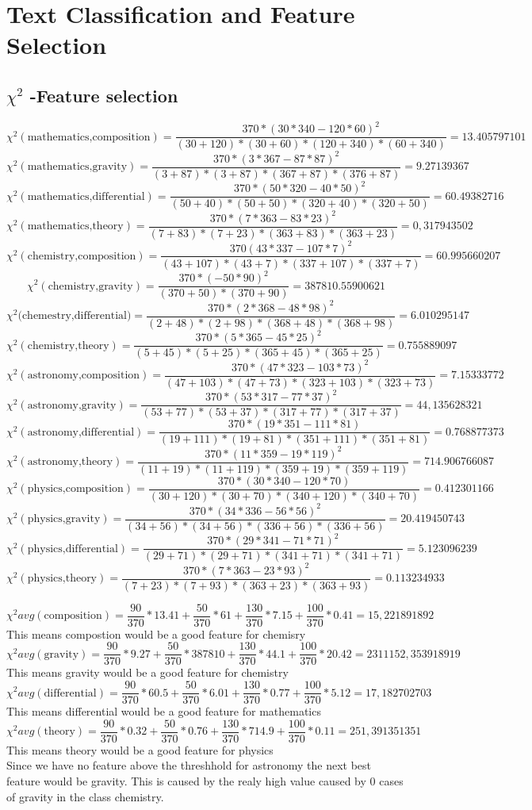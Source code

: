 \documentclass{article}
\begin{document}
\section{Text Classification and Feature Selection}
\setcounter{subsection}{2}
\subsection{$\chi^2$ -Feature selection}
$$\chi^2(\text{mathematics,composition})=\frac{370*(30*340-120*60)^2}{(30+120)*(30+60)*(120+340)*(60+340)}=13.405797101$$
$$\chi^2(\text{mathematics,gravity})=\frac{370*(3*367-87*87)^2}{(3+87)*(3+87)*(367+87)*(376+87)}=9.27139367$$
$$\chi^2(\text{mathematics,differential})=\frac{370*(50*320-40*50)^2}{(50+40)*(50+50)*(320+40)*(320+50)}=60.49382716$$
$$\chi^2(\text{mathematics,theory})=\frac{370*(7*363-83*23)^2}{(7+83)*(7+23)*(363+83)*(363+23)}=0,317943502$$
$$\chi^2(\text{chemistry,composition})=\frac{370(43*337-107*7)^2}{(43+107)*(43+7)*(337+107)*(337+7)}=60.995660207$$
$$\chi^2(\text{chemistry,gravity})=\frac{370*(-50*90)^2}{(370+50)*(370+90)}=387810.55900621$$
$$\chi^2(\text{chemestry,differential)}=\frac{370*(2*368-48*98)^2}{(2+48)*(2+98)*(368+48)*(368+98)}=6.010295147$$
$$\chi^2(\text{chemistry,theory})=\frac{370*(5*365-45*25)^2}{(5+45)*(5+25)*(365+45)*(365+25)}=0.755889097$$
$$\chi^2(\text{astronomy,composition})=\frac{370*(47*323-103*73)^2}{(47+103)*(47+73)*(323+103)*(323+73)}=7.15333772$$
$$\chi^2(\text{astronomy,gravity})=\frac{370*(53*317-77*37)^2}{(53+77)*(53+37)*(317+77)*(317+37)}=44,135628321$$
$$\chi^2(\text{astronomy,differential})=\frac{370*(19*351-111*81)}{(19+111)*(19+81)*(351+111)*(351+81)}=0.768877373$$
$$\chi^2(\text{astronomy,theory})=\frac{370*(11*359-19*119)^2}{(11+19)*(11+119)*(359+19)*(359+119)}=714.906766087$$
$$\chi^2(\text{physics,composition})=\frac{370*(30*340-120*70)}{(30+120)*(30+70)*(340+120)*(340+70)}=0.412301166$$
$$\chi^2(\text{physics,gravity})=\frac{370*(34*336-56*56)^2}{(34+56)*(34+56)*(336+56)*(336+56)}=20.419450743$$
$$\chi^2(\text{physics,differential})=\frac{370*(29*341-71*71)^2}{(29+71)*(29+71)*(341+71)*(341+71)}=5.123096239$$
$$\chi^2(\text{physics,theory})=\frac{370*(7*363-23*93)^2}{(7+23)*(7+93)*(363+23)*(363+93)}=0.113234933$$

$$\chi^2 avg(\text{composition})=\frac{90}{370}*13.41+\frac{50}{370}*61+\frac{130}{370}*7.15+\frac{100}{370}*0.41=15,221891892$$
This means compostion would be a good feature for chemisry
$$\chi^2 avg(\text{gravity})=\frac{90}{370}*9.27+\frac{50}{370}*387810+\frac{130}{370}*44.1+\frac{100}{370}*20.42=2311152,353918919$$
This means gravity would be a good feature for chemistry
$$\chi^2 avg(\text{differential})=\frac{90}{370}*60.5+\frac{50}{370}*6.01+\frac{130}{370}*0.77+\frac{100}{370}*5.12=17,182702703$$
This means differential would be a good feature for mathematics 
$$\chi^2 avg(\text{theory})=\frac{90}{370}*0.32+\frac{50}{370}*0.76+\frac{130}{370}*714.9+\frac{100}{370}*0.11=251,391351351$$
This means theory would be a good feature for physics\\
Since we have no feature above the threshhold for astronomy the next best feature would be gravity.
This is caused by the realy high value caused by 0 cases of gravity in the class chemistry.
\end{document}
